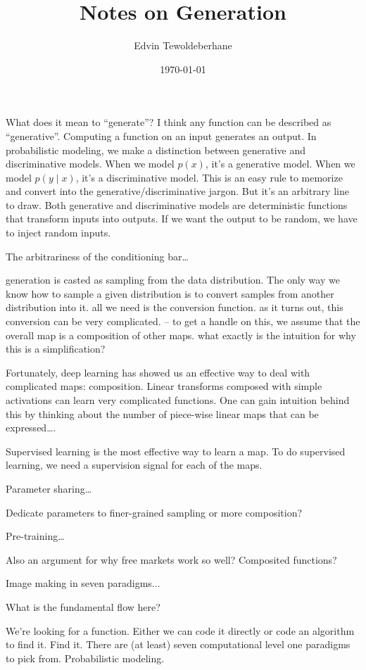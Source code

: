 \documentclass[11pt]{article}
\title{Notes on Generation}
\author{Edvin Tewoldeberhane}
\date{\today}
\begin{document}
\maketitle

What does it mean to ``generate''? I think any function can be described as ``generative''. Computing a function on an input generates an output. In probabilistic modeling, we make a distinction between generative and discriminative models. When we model $p(x)$, it's a generative model. When we model $p(y\mid x)$, it's a discriminative model. This is an easy rule to memorize and convert into the generative/discriminative jargon. But it's an arbitrary line to draw. Both generative and discriminative models are deterministic functions that transform inputs into outputs. If we want the output to be random, we have to inject random inputs. 

The arbitrariness of the conditioning bar\dots

generation is casted as sampling from the data distribution. The only way we know how to sample a given distribution is to convert samples from another distribution into it. all we need is the conversion function. as it turns out, this conversion can be very complicated. -- to get a handle on this, we assume that the overall map is a composition of other maps. what exactly is the intuition for why this is a simplification?


Fortunately, deep learning has showed us an effective way to deal with complicated maps: composition. Linear transforms composed with simple activations can learn very complicated functions. One can gain intuition behind this by thinking about the number of piece-wise linear maps that can be expressed\dots.

Supervised learning is the most effective way to learn a map. To do supervised learning, we need a supervision signal for each of the maps.

Parameter sharing\dots

Dedicate parameters to finer-grained sampling or more composition?

Pre-training\dots

Also an argument for why free markets work so well? Composited functions?

Image making in seven paradigms...

What is the fundamental flow here?

We're looking for a function. Either we can code it directly or code an algorithm to find it. Find it. There are (at least) seven computational level one paradigms to pick from. Probabilistic modeling. 
\end{document}
